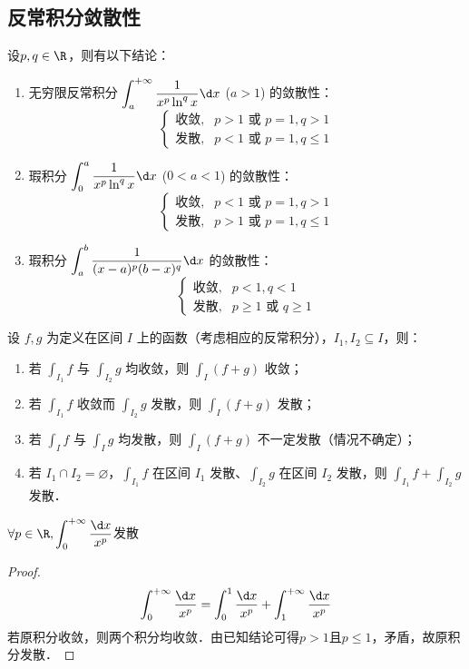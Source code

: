 \documentclass[12pt, a4paper, oneside, UTF8]{ctexbook}
\begin{document}
\subsection{反常积分敛散性}
\begin{theorem}[常用反常积分敛散性结论]
    设$p,q \in \R$，则有以下结论：
    \begin{enumerate}
        \item 无穷限反常积分 $\displaystyle\int_{a}^{+\infty} \dfrac{1}{x^p\ln^q x} \d x$ ($a>1$) 的敛散性：
        \[
            \begin{cases}
                \text{收敛}, & p>1 \text{ 或 } p=1, q>1 \\
                \text{发散}, & p<1 \text{ 或 } p=1, q \le 1
            \end{cases}
        \]
        \item 瑕积分 $\displaystyle\int_{0}^{a} \dfrac{1}{x^p\ln^q x} \d x$ ($0<a<1$) 的敛散性：
        \[
            \begin{cases}
                \text{收敛}, & p<1 \text{ 或 } p=1, q>1 \\
                \text{发散}, & p>1 \text{ 或 } p=1, q \le 1
            \end{cases}
        \]
        \item 瑕积分 $\displaystyle\int_{a}^{b} \dfrac{1}{(x-a)^p (b-x)^q} \d x$ 的敛散性：
        \[
            \begin{cases}
                \text{收敛}, & p<1, q<1 \\
                \text{发散}, & p \ge 1 \text{ 或 } q \ge 1
            \end{cases}
        \]
    \end{enumerate}
\end{theorem}
\begin{theorem}
设 $f,g$ 为定义在区间 $I$ 上的函数（考虑相应的反常积分），$I_1,I_2\subseteq I$，则：
\begin{enumerate}
    \item 若 $\displaystyle\int_{I_1} f$ 与 $\displaystyle\int_{I_2} g$ 均收敛，则 $\displaystyle\int_I (f+g)$ 收敛；
    \item 若 $\displaystyle\int_{I_1} f$ 收敛而 $\displaystyle\int_{I_2} g$ 发散，则 $\displaystyle\int_I (f+g)$ 发散；
    \item 若 $\displaystyle\int_I f$ 与 $\displaystyle\int_I g$ 均发散，则 $\displaystyle\int_I (f+g)$ 不一定发散（情况不确定）；
    \item 若 $I_1 \cap I_2 = \varnothing$，$\displaystyle\int_{I_1} f$ 在区间 $I_1$ 发散、$\displaystyle\int_{I_2} g$ 在区间 $I_2$ 发散，则 $\displaystyle\int_{I_1}f+\int_{I_2} g$ 发散．
\end{enumerate}
\end{theorem}
\begin{theorem}
    $\forall p \in \R,\displaystyle\int_{0}^{+\infty}\dfrac{\d x}{x^p}$发散
\end{theorem}
\begin{proof}
    \[
        \int_{0}^{+\infty} \dfrac{\d x}{x^p}
        =\int_{0}^{1} \dfrac{\d x}{x^p} + \int_{1}^{+\infty} \dfrac{\d x}{x^p}
    \]
    若原积分收敛，则两个积分均收敛．由已知结论可得$p>1$且$p \le 1$，矛盾，故原积分发散．
\end{proof}
\end{document}
